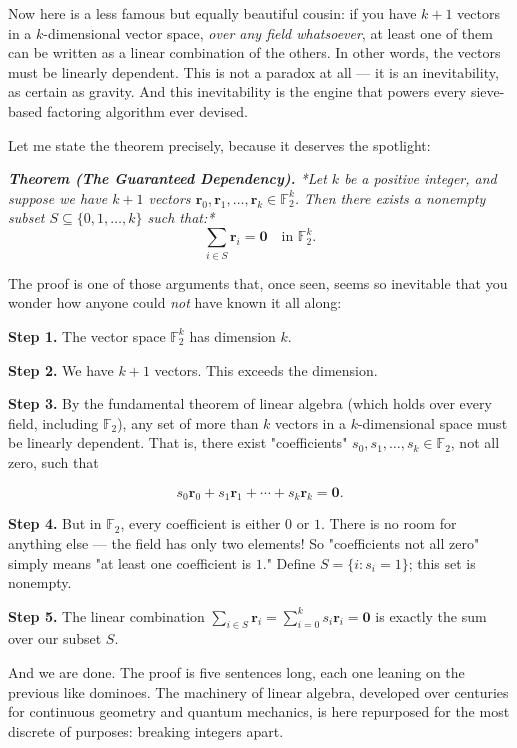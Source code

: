 \documentclass[11pt,openright,twoside]{book}
\renewenvironment{quotation}{%
  \par\vspace{8pt}%
  \begin{list}{}{%
    \setlength{\leftmargin}{2em}%
    \setlength{\rightmargin}{2em}%
  }\item[]\itshape\color{pullquote}%
}{%
  \end{list}%
  \par\vspace{8pt}%
}
\theoremstyle{definition}
\begin{document}
Now here is a less famous but equally beautiful cousin: if you have $k + 1$ vectors in a $k$-dimensional vector space, \textit{over any field whatsoever}, at least one of them can be written as a linear combination of the others. In other words, the vectors must be linearly dependent. This is not a paradox at all --- it is an inevitability, as certain as gravity. And this inevitability is the engine that powers every sieve-based factoring algorithm ever devised.

Let me state the theorem precisely, because it deserves the spotlight:

\begin{quotation}
\noindent\itshape \textbf{Theorem (The Guaranteed Dependency).} *Let $k$ be a positive integer, and suppose we have $k + 1$ vectors $\mathbf{r}_0, \mathbf{r}_1, \ldots, \mathbf{r}_k \in \mathbb{F}_2^k$. Then there exists a nonempty subset $S \subseteq \{0, 1, \ldots, k\}$ such that:* $$\sum_{i \in S} \mathbf{r}_i = \mathbf{0} \quad \text{in } \mathbb{F}_2^k.$$
\end{quotation}

The proof is one of those arguments that, once seen, seems so inevitable that you wonder how anyone could \textit{not} have known it all along:

\textbf{Step 1.} The vector space $\mathbb{F}_2^k$ has dimension $k$.

\textbf{Step 2.} We have $k + 1$ vectors. This exceeds the dimension.

\textbf{Step 3.} By the fundamental theorem of linear algebra (which holds over every field, including $\mathbb{F}_2$), any set of more than $k$ vectors in a $k$-dimensional space must be linearly dependent. That is, there exist "coefficients" $s_0, s_1, \ldots, s_k \in \mathbb{F}_2$, not all zero, such that

\[s_0 \mathbf{r}_0 + s_1 \mathbf{r}_1 + \cdots + s_k \mathbf{r}_k = \mathbf{0}.\]

\textbf{Step 4.} But in $\mathbb{F}_2$, every coefficient is either $0$ or $1$. There is no room for anything else --- the field has only two elements! So "coefficients not all zero" simply means "at least one coefficient is $1$." Define $S = \{i : s_i = 1\}$; this set is nonempty.

\textbf{Step 5.} The linear combination $\sum_{i \in S} \mathbf{r}_i = \sum_{i=0}^k s_i \mathbf{r}_i = \mathbf{0}$ is exactly the sum over our subset $S$.

And we are done. The proof is five sentences long, each one leaning on the previous like dominoes. The machinery of linear algebra, developed over centuries for continuous geometry and quantum mechanics, is here repurposed for the most discrete of purposes: breaking integers apart.
\end{document}
